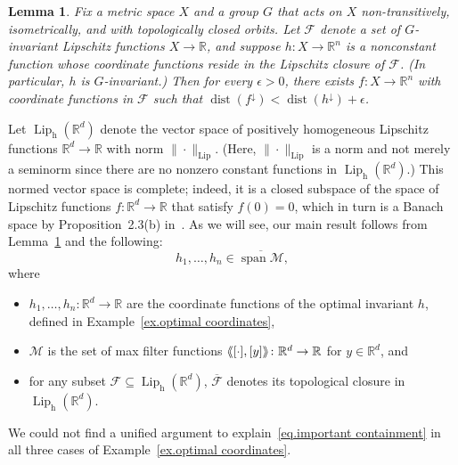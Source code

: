 \documentclass{article}
\theoremstyle{plain}
\newtheorem{lemma}[theorem]{Lemma}
\theoremstyle{definition}
\newcommand{\llangle}{\langle\hspace{-2.5pt}\langle}
\newcommand{\rrangle}{\rangle\hspace{-2.5pt}\rangle}
\begin{document}
\begin{lemma}
\label{lem.lipschitz closures suffice}
Fix a metric space $X$ and a group $G$ that acts on $X$ non-transitively, isometrically, and with topologically closed orbits.
Let $\mathcal{F}$ denote a set of $G$-invariant Lipschitz functions $X\to\mathbb{R}$, and suppose $h\colon X\to\mathbb{R}^n$ is a nonconstant function whose coordinate functions reside in the Lipschitz closure of $\mathcal{F}$. 
(In particular, $h$ is $G$-invariant.)
Then for every $\epsilon>0$, there exists $f\colon X\to\mathbb{R}^n$ with coordinate functions in $\mathcal{F}$ such that $\operatorname{dist}(f^\downarrow)<\operatorname{dist}(h^\downarrow)+\epsilon$.
\end{lemma}

Let $\operatorname{Lip}_{\operatorname{h}}(\mathbb{R}^d)$ denote the vector space of positively homogeneous Lipschitz functions $\mathbb{R}^d\to\mathbb{R}$ with norm $\|\cdot\|_{\operatorname{Lip}}$.
(Here, $\|\cdot\|_{\operatorname{Lip}}$ is a norm and not merely a seminorm since there are no nonzero constant functions in $\operatorname{Lip}_{\operatorname{h}}(\mathbb{R}^d)$.)
This normed vector space is complete; indeed, it is a closed subspace of the space of Lipschitz functions $f\colon\mathbb{R}^d\to\mathbb{R}$ that satisfy $f(0)=0$, which in turn is a Banach space by Proposition~2.3(b) in~\cite{Weaver:18}.
As we will see, our main result follows from Lemma~\ref{lem.lipschitz closures suffice} and the following:
\begin{equation}
\label{eq.important containment}
h_1,\ldots,h_n\in
\overline{\operatorname{span}\mathcal{M}},
\end{equation}
where
\begin{itemize}
\item
$h_1,\ldots,h_n\colon\mathbb{R}^d\to\mathbb{R}$ are the coordinate functions of the optimal invariant $h$, defined in Example~\ref{ex.optimal coordinates},
\item
$\mathcal{M}$ is the set of max filter functions $\llangle[\cdot],[y]\rrangle\colon\mathbb{R}^d\to\mathbb{R}$ for $y\in\mathbb{R}^d$, and
\item
for any subset $\mathcal{F}\subseteq\operatorname{Lip}_{\operatorname{h}}(\mathbb{R}^d)$, $\overline{\mathcal{F}}$ denotes its topological closure in $\operatorname{Lip}_{\operatorname{h}}(\mathbb{R}^d)$.
\end{itemize}
We could not find a unified argument to explain~\eqref{eq.important containment} in all three cases of Example~\ref{ex.optimal coordinates}.
\end{document}
